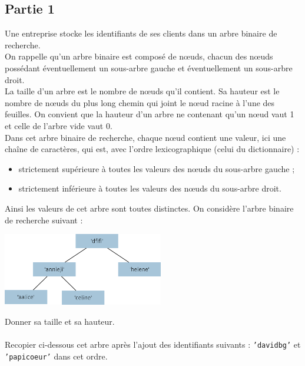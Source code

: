 \documentclass[a4paper,12pt,eval,firamath]{nsi}
\begin{document}
\subsection*{Partie 1}

Une entreprise stocke les identifiants de ses clients dans un arbre binaire de
recherche.\\
On rappelle qu'un arbre binaire est composé de nœuds, chacun des nœuds possédant
éventuellement un sous-arbre gauche et éventuellement un sous-arbre droit.\\
La taille d'un arbre est le nombre de nœuds qu'il contient. Sa hauteur est le nombre
de nœuds du plus long chemin qui joint le nœud racine à l'une des feuilles.
On convient que la hauteur d'un arbre ne contenant qu'un nœud vaut 1 et celle de
l'arbre vide vaut 0.\\
Dans cet arbre binaire de recherche, chaque nœud contient une valeur, ici une chaîne
de caractères, qui est, avec l'ordre lexicographique (celui du dictionnaire) :
\begin{itemize}
      \item strictement supérieure à toutes les valeurs des nœuds du sous-arbre gauche ;
      \item  strictement inférieure à toutes les valeurs des nœuds du sous-arbre droit.
\end{itemize}
Ainsi les valeurs de cet arbre sont toutes distinctes.
On considère l'arbre binaire de recherche suivant :
\begin{center}
      \includegraphics[width=7cm]{img/fig01.png}
\end{center}

\question Donner sa taille et sa hauteur.\\

\\

\question Recopier ci-dessous cet arbre après l'ajout des identifiants suivants : \texttt{'davidbg'}  et \texttt{'papicoeur'} dans cet ordre.\\

\end{document}
